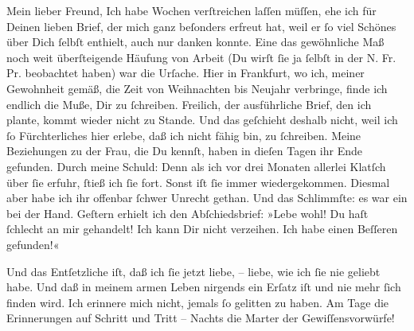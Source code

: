 \pstart{}Mein lieber Freund,\pend\vspace{0.5em}
\pstart
           Ich habe Wochen verſtreichen laſſen müſſen, ehe ich für Deinen lieben Brief, der mich
               ganz beſonders erfreut hat, weil er ſo viel Schönes über Dich ſelbſt enthielt, auch
               nur danken konnte. Eine das gewöhnliche Maß noch weit überſteigende Häufung von
               Arbeit (Du wirſt ſie ja ſelbſt in der N. Fr. Pr.
               beobachtet haben) war die Urſache. Hier in Frankfurt, wo ich, meiner Gewohnheit gemäß, die Zeit von Weihnachten bis Neujahr
               verbringe, finde ich endlich die {\pb}Muße, Dir zu
               ſchreiben. Freilich, der ausführliche Brief, den ich plante, kommt wieder nicht zu
               Stande. Und das geſchieht deshalb nicht, weil ich ſo Fürchterliches hier erlebe, daß
               ich nicht fähig bin, zu ſchreiben. Meine Beziehungen zu der Frau, die Du kennſt, haben in dieſen Tagen
               ihr Ende gefunden. Durch meine Schuld: Denn als ich vor drei Monaten allerlei Klatſch
               über ſie erfuhr, ſtieß ich ſie fort. Sonst iſt ſie immer wiedergekommen. Diesmal aber
               habe ich ihr offenbar ſchwer Unrecht gethan. Und das Schlimmſte: es war ein \label{K_L03231-1v}\label{K_L03231-1} bei der Hand.
                  Geſtern erhielt ich den Abſchiedsbrief: »Lebe wohl!
               Du haſt ſchlecht an mir gehandelt! Ich kann Dir nicht verzeihen. Ich habe einen Beſſeren gefunden!«\pend
           
\pstart
           Und das Entſetzliche iſt, daß ich ſie jetzt liebe, – liebe, wie ich ſie nie geliebt
               habe. Und daß in meinem armen Leben nirgends ein Erſatz iſt und nie mehr ſich finden
               wird. Ich erinnere mich nicht, jemals ſo gelitten zu haben. Am Tage die Erinnerungen
               auf Schritt und Tritt – Nachts die Marter {\pb}der
               Gewiſſensvorwürfe!\pend
           
